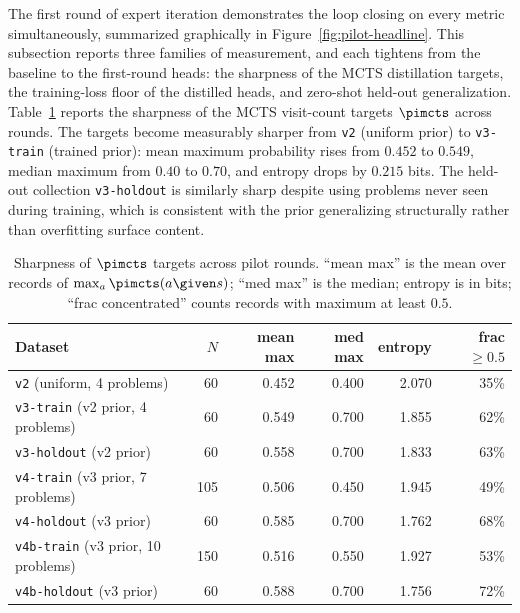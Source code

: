The first round of expert iteration demonstrates the loop closing on
every metric simultaneously, summarized graphically in
Figure~\ref{fig:pilot-headline}. This subsection reports three families
of measurement, and each tightens from the baseline to the first-round
heads: the sharpness of the MCTS distillation targets, the
training-loss floor of the distilled heads, and zero-shot held-out
generalization. Table~\ref{tab:pilot-sharpness} reports
the sharpness of the MCTS visit-count targets $\pimcts$ across rounds.
The targets become measurably sharper from \texttt{v2} (uniform prior)
to \texttt{v3-train} (trained prior): mean maximum probability rises
from $0.452$ to $0.549$, median maximum from $0.40$ to $0.70$, and
entropy drops by $0.215$ bits. The held-out collection \texttt{v3-holdout}
is similarly sharp despite using problems never seen during training,
which is consistent with the prior generalizing structurally rather
than overfitting surface content.

\begin{table}[t]
\centering
\caption{Sharpness of $\pimcts$ targets across pilot rounds.
``mean max'' is the mean over records of $\max_a \pimcts(a \given s)$;
``med max'' is the median; entropy is in bits; ``frac concentrated''
counts records with maximum at least $0.5$.}
\label{tab:pilot-sharpness}
\small
\begin{tabular}{@{}lrrrrr@{}}
\toprule
Dataset & $N$ & mean max & med max & entropy & frac $\geq 0.5$ \\
\midrule
\texttt{v2}                  (uniform, 4 problems)    & 60  & 0.452 & 0.400 & 2.070 & 35\% \\
\texttt{v3-train}            (v2 prior, 4 problems)   & 60  & 0.549 & 0.700 & 1.855 & 62\% \\
\texttt{v3-holdout}          (v2 prior)               & 60  & 0.558 & 0.700 & 1.833 & 63\% \\
\texttt{v4-train}            (v3 prior, 7 problems)   & 105 & 0.506 & 0.450 & 1.945 & 49\% \\
\texttt{v4-holdout}          (v3 prior)               & 60  & 0.585 & 0.700 & 1.762 & 68\% \\
\texttt{v4b-train}           (v3 prior, 10 problems)  & 150 & 0.516 & 0.550 & 1.927 & 53\% \\
\texttt{v4b-holdout}         (v3 prior)               & 60  & 0.588 & 0.700 & 1.756 & 72\% \\
\bottomrule
\end{tabular}
\end{table}

